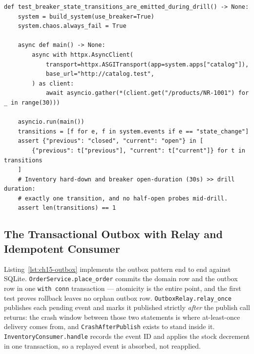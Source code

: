 \begin{verbatim}
def test_breaker_state_transitions_are_emitted_during_drill() -> None:
    system = build_system(use_breaker=True)
    system.chaos.always_fail = True

    async def main() -> None:
        async with httpx.AsyncClient(
            transport=httpx.ASGITransport(app=system.apps["catalog"]),
            base_url="http://catalog.test",
        ) as client:
            await asyncio.gather(*(client.get("/products/NR-1001") for _ in range(30)))

    asyncio.run(main())
    transitions = [f for e, f in system.events if e == "state_change"]
    assert {"previous": "closed", "current": "open"} in [
        {"previous": t["previous"], "current": t["current"]} for t in transitions
    ]
    # Inventory hard-down and breaker open-duration (30s) >> drill duration:
    # exactly one transition, and no half-open probes mid-drill.
    assert len(transitions) == 1
\end{verbatim}

\subsection{The Transactional Outbox with Relay and Idempotent Consumer}
\label{subsec:ch15-code-outbox}

Listing~\ref{lst:ch15-outbox} implements the outbox pattern end to end
against SQLite. \texttt{OrderService.place\_order} commits the domain row
and the outbox row in one \texttt{with conn} transaction --- atomicity is
the entire point, and the first test proves rollback leaves no orphan
outbox row. \texttt{OutboxRelay.relay\_once} publishes each pending event
and marks it published strictly \emph{after} the publish call returns: the
crash window between those two statements is where at-least-once delivery
comes from, and \texttt{CrashAfterPublish} exists to stand inside it.
\texttt{InventoryConsumer.handle} records the event ID and applies the
stock decrement in one transaction, so a replayed event is absorbed, not
reapplied.

